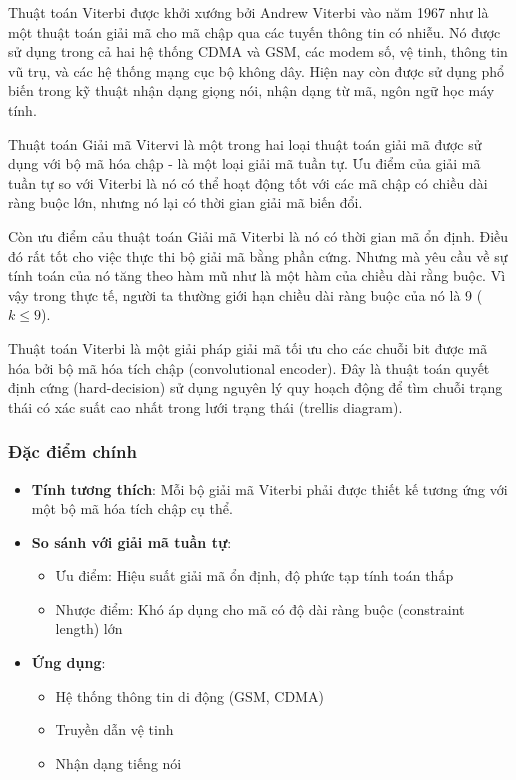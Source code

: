 Thuật toán Viterbi được khởi xướng bởi Andrew Viterbi vào năm 1967 như là một thuật toán giải mã cho mã chập qua các tuyến thông tin có nhiễu. Nó được sử dụng trong cả hai hệ thống CDMA và GSM, các modem số, vệ tinh, thông tin vũ trụ, và các hệ thống mạng cục bộ không dây. Hiện nay còn được sử dụng phổ biến trong kỹ thuật nhận dạng giọng nói, nhận dạng từ mã, ngôn ngữ học máy tính.

Thuật toán Giải mã Vitervi là một trong hai loại thuật toán giải mã được sử dụng với bộ mã hóa chập - là một loại giải mã tuần tự. Ưu điểm của giải mã tuần tự so với Viterbi là nó có thể hoạt động tốt với các mã chập có chiều dài ràng buộc lớn, nhưng nó lại có thời gian giải mã biến đổi.

Còn ưu điểm cảu thuật toán Giải mã Viterbi là nó có thời gian mã ổn định. Điều đó rất tốt cho việc thực thi bộ giải mã bằng phần cứng. Nhưng mà yêu cầu về sự tính toán của nó tăng theo hàm mũ như là một hàm của chiều dài rằng buộc. Vì vậy trong thực tế, người ta thường giới hạn chiều dài ràng buộc của nó là 9 ($k \leq 9$).

Thuật toán Viterbi là một giải pháp giải mã tối ưu cho các chuỗi bit được mã hóa bởi bộ mã hóa tích chập (convolutional encoder). Đây là thuật toán quyết định cứng (hard-decision) sử dụng nguyên lý quy hoạch động để tìm chuỗi trạng thái có xác suất cao nhất trong lưới trạng thái (trellis diagram).

\subsubsection*{Đặc điểm chính}
\begin{itemize}[label=-]
	\item \textbf{Tính tương thích}: Mỗi bộ giải mã Viterbi phải được thiết kế tương ứng với một bộ mã hóa tích chập cụ thể.
	
	\item \textbf{So sánh với giải mã tuần tự}:
	\begin{itemize}[label=+]
		\item Ưu điểm: Hiệu suất giải mã ổn định, độ phức tạp tính toán thấp
		\item Nhược điểm: Khó áp dụng cho mã có độ dài ràng buộc (constraint length) lớn
	\end{itemize}
	
	\item \textbf{Ứng dụng}:
	\begin{itemize}[label=+]
		\item Hệ thống thông tin di động (GSM, CDMA)
		\item Truyền dẫn vệ tinh
		\item Nhận dạng tiếng nói
	\end{itemize}
\end{itemize}


